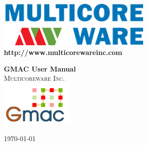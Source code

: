 \begin{titlingpage}

\includegraphics[height=64pt]{mcw}\\[0.1in]
\textbf{\Large{http://www.multicorewareinc.com}}\\[1in]

\begin{flushright}
{\HUGE \bfseries GMAC User Manual}\\[0.5in]
\textsc{\Large Multicoreware Inc.}\\[0.5in]
\includegraphics[height=64pt]{logo}\\[0.5in]
\end{flushright}


\vfill
\begin{center}
{\large \today}
\end{center}

\end{titlingpage}
